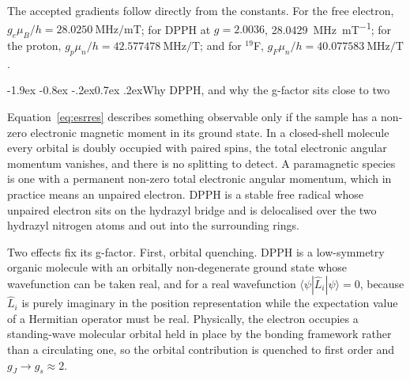\documentclass[11pt,a4paper]{article}
\makeatletter
\renewcommand\subsection{\@startsection{subsection}{2}{\z@}%
  {-1.9ex \@plus -0.8ex \@minus -.2ex}{0.7ex \@plus .2ex}{\normalfont\normalsize\bfseries}}
\makeatother
\begin{document}
The accepted gradients follow directly from the constants. For the free electron,
$g_e\mu_B/h = \SI{28.0250}{\mega\hertz\per\milli\tesla}$; for DPPH at $g = 2.0036$,
\SI{28.0429}{\mega\hertz\per\milli\tesla}; for the proton,
$g_p\mu_n/h = \SI{42.577478}{\mega\hertz\per\tesla}$; and for $^{19}$F,
$g_F\mu_n/h = \SI{40.077583}{\mega\hertz\per\tesla}$ \cite{codata,stone,harris}.

\subsection{Why DPPH, and why the g-factor sits close to two}

Equation~\eqref{eq:esrres} describes something observable only if the sample has a non-zero
electronic magnetic moment in its ground state. In a closed-shell molecule every orbital is
doubly occupied with paired spins, the total electronic angular momentum vanishes, and there is
no splitting to detect. A paramagnetic species is one with a permanent non-zero total electronic
angular momentum, which in practice means an unpaired electron. DPPH is a stable free radical
whose unpaired electron sits on the hydrazyl bridge and is delocalised over the two hydrazyl
nitrogen atoms and out into the surrounding rings.

Two effects fix its g-factor. First, orbital quenching. DPPH is a low-symmetry organic molecule
with an orbitally non-degenerate ground state whose wavefunction can be taken real, and for a
real wavefunction $\langle\psi|\hat{L}_i|\psi\rangle = 0$, because $\hat{L}_i$ is purely imaginary
in the position representation while the expectation value of a Hermitian operator must be real.
Physically, the electron occupies a standing-wave molecular orbital held in place by the bonding
framework rather than a circulating one, so the orbital contribution is quenched to first order
and $g_J \to g_s \approx 2$.
\end{document}
